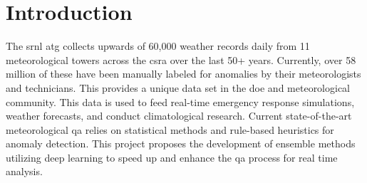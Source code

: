 \section{Introduction}
\label{sec:introduction}

The \gls{srnl} \gls{atg} \cite{HomeATG} collects upwards of 60,000 weather records daily from 11 meteorological towers across the \gls{csra} over the last 50+ years. Currently, over 58 million of these have been manually labeled for anomalies by their meteorologists and technicians. This provides a unique data set in the \gls{doe} and meteorological community. This data is used to feed real-time emergency response simulations, weather forecasts, and conduct climatological research. Current state-of-the-art meteorological \gls{qa} relies on statistical methods and rule-based heuristics for anomaly detection. This project proposes the development of ensemble methods utilizing deep learning to speed up and enhance the \gls{qa} process for real time analysis.
